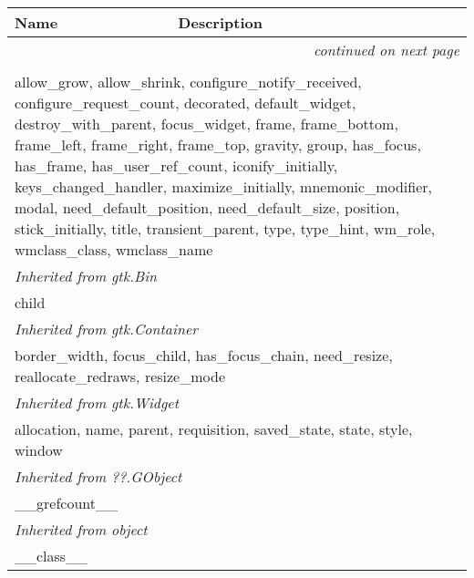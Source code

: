     \vspace{-1cm}
\hspace{\varindent}\begin{longtable}{|p{\varnamewidth}|p{\vardescrwidth}|l}
\cline{1-2}
\cline{1-2} \centering \textbf{Name} & \centering \textbf{Description}& \\
\cline{1-2}
\endhead\cline{1-2}\multicolumn{3}{r}{\small\textit{continued on next page}}\\\endfoot\cline{1-2}
\endlastfoot\multicolumn{2}{|l|}{\textit{Inherited from gtk.Window}}\\
\multicolumn{2}{|p{\varwidth}|}{\raggedright allow\_grow, allow\_shrink, configure\_notify\_received, configure\_request\_count, decorated, default\_widget, destroy\_with\_parent, focus\_widget, frame, frame\_bottom, frame\_left, frame\_right, frame\_top, gravity, group, has\_focus, has\_frame, has\_user\_ref\_count, iconify\_initially, keys\_changed\_handler, maximize\_initially, mnemonic\_modifier, modal, need\_default\_position, need\_default\_size, position, stick\_initially, title, transient\_parent, type, type\_hint, wm\_role, wmclass\_class, wmclass\_name}\\
\cline{1-2}
\multicolumn{2}{|l|}{\textit{Inherited from gtk.Bin}}\\
\multicolumn{2}{|p{\varwidth}|}{\raggedright child}\\
\cline{1-2}
\multicolumn{2}{|l|}{\textit{Inherited from gtk.Container}}\\
\multicolumn{2}{|p{\varwidth}|}{\raggedright border\_width, focus\_child, has\_focus\_chain, need\_resize, reallocate\_redraws, resize\_mode}\\
\cline{1-2}
\multicolumn{2}{|l|}{\textit{Inherited from gtk.Widget}}\\
\multicolumn{2}{|p{\varwidth}|}{\raggedright allocation, name, parent, requisition, saved\_state, state, style, window}\\
\cline{1-2}
\multicolumn{2}{|l|}{\textit{Inherited from ??.GObject}}\\
\multicolumn{2}{|p{\varwidth}|}{\raggedright \_\_grefcount\_\_}\\
\cline{1-2}
\multicolumn{2}{|l|}{\textit{Inherited from object}}\\
\multicolumn{2}{|p{\varwidth}|}{\raggedright \_\_class\_\_}\\
\cline{1-2}
\end{longtable}



